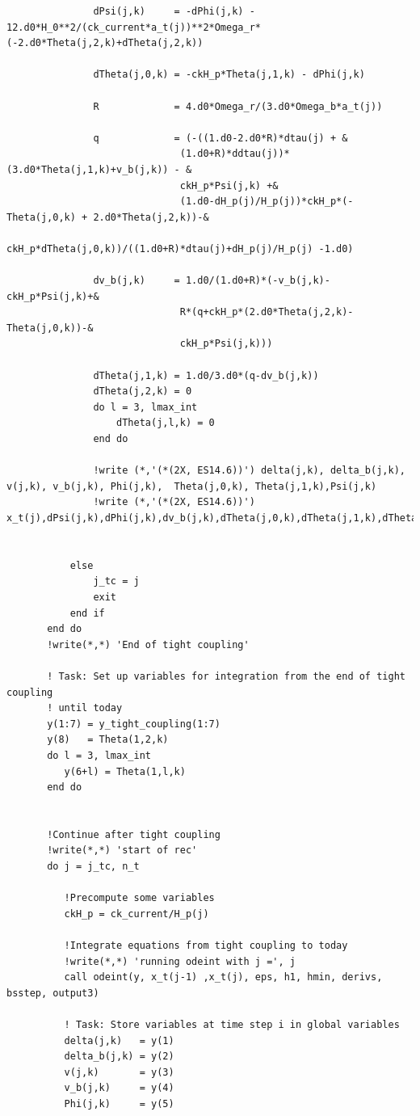 \documentclass[a4paper]{report}
\begin{document}
\begin{verbatim}
               dPsi(j,k)     = -dPhi(j,k) - 12.d0*H_0**2/(ck_current*a_t(j))**2*Omega_r*(-2.d0*Theta(j,2,k)+dTheta(j,2,k))

               dTheta(j,0,k) = -ckH_p*Theta(j,1,k) - dPhi(j,k)

               R             = 4.d0*Omega_r/(3.d0*Omega_b*a_t(j))

               q             = (-((1.d0-2.d0*R)*dtau(j) + &
                              (1.d0+R)*ddtau(j))*(3.d0*Theta(j,1,k)+v_b(j,k)) - &
                              ckH_p*Psi(j,k) +&
                              (1.d0-dH_p(j)/H_p(j))*ckH_p*(-Theta(j,0,k) + 2.d0*Theta(j,2,k))-&
                              ckH_p*dTheta(j,0,k))/((1.d0+R)*dtau(j)+dH_p(j)/H_p(j) -1.d0)
 
               dv_b(j,k)     = 1.d0/(1.d0+R)*(-v_b(j,k)-ckH_p*Psi(j,k)+&
                              R*(q+ckH_p*(2.d0*Theta(j,2,k)-Theta(j,0,k))-&
                              ckH_p*Psi(j,k)))

               dTheta(j,1,k) = 1.d0/3.d0*(q-dv_b(j,k))
               dTheta(j,2,k) = 0
               do l = 3, lmax_int
                   dTheta(j,l,k) = 0 
               end do	

               !write (*,'(*(2X, ES14.6))') delta(j,k), delta_b(j,k), v(j,k), v_b(j,k), Phi(j,k),  Theta(j,0,k), Theta(j,1,k),Psi(j,k)
               !write (*,'(*(2X, ES14.6))') x_t(j),dPsi(j,k),dPhi(j,k),dv_b(j,k),dTheta(j,0,k),dTheta(j,1,k),dTheta(j,2,k)


           else
               j_tc = j
               exit
           end if
       end do
       !write(*,*) 'End of tight coupling'

       ! Task: Set up variables for integration from the end of tight coupling 
       ! until today
       y(1:7) = y_tight_coupling(1:7)
       y(8)   = Theta(1,2,k)
       do l = 3, lmax_int
          y(6+l) = Theta(1,l,k)
       end do


       !Continue after tight coupling
       !write(*,*) 'start of rec'       
       do j = j_tc, n_t

          !Precompute some variables
          ckH_p = ck_current/H_p(j)

          !Integrate equations from tight coupling to today
          !write(*,*) 'running odeint with j =', j
          call odeint(y, x_t(j-1) ,x_t(j), eps, h1, hmin, derivs, bsstep, output3)

          ! Task: Store variables at time step i in global variables
          delta(j,k)   = y(1)
          delta_b(j,k) = y(2)
          v(j,k)       = y(3)
          v_b(j,k)     = y(4)
          Phi(j,k)     = y(5)
          

\end{verbatim}
\end{document}
